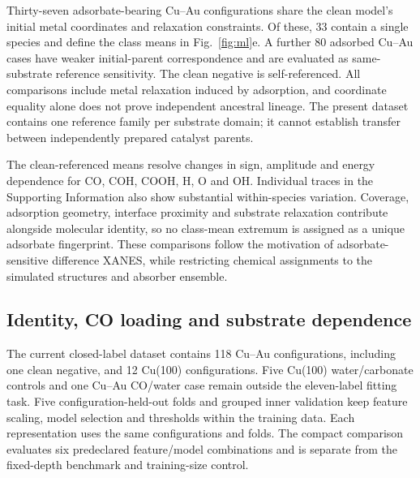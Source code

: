 \documentclass[11pt,a4paper]{article}
\begin{document}
Thirty-seven adsorbate-bearing Cu--Au configurations share the clean model's initial metal coordinates and relaxation constraints. Of these, 33 contain a single species and define the class means in Fig.~\ref{fig:ml}e. A further 80 adsorbed Cu--Au cases have weaker initial-parent correspondence and are evaluated as same-substrate reference sensitivity. The clean negative is self-referenced. All comparisons include metal relaxation induced by adsorption, and coordinate equality alone does not prove independent ancestral lineage. The present dataset contains one reference family per substrate domain; it cannot establish transfer between independently prepared catalyst parents.

The clean-referenced means resolve changes in sign, amplitude and energy dependence for CO, COH, COOH, H, O and OH. Individual traces in the Supporting Information also show substantial within-species variation. Coverage, adsorption geometry, interface proximity and substrate relaxation contribute alongside molecular identity, so no class-mean extremum is assigned as a unique adsorbate fingerprint. These comparisons follow the motivation of adsorbate-sensitive difference XANES,\cite{ramaker2010,ramaker2014} while restricting chemical assignments to the simulated structures and absorber ensemble.

\subsection{Identity, CO loading and substrate dependence}
The current closed-label dataset contains 118 Cu--Au configurations, including one clean negative, and 12 Cu(100) configurations. Five Cu(100) water/carbonate controls and one Cu--Au CO/water case remain outside the eleven-label fitting task. Five configuration-held-out folds and grouped inner validation keep feature scaling, model selection and thresholds within the training data. Each representation uses the same configurations and folds. The compact comparison evaluates six predeclared feature/model combinations and is separate from the fixed-depth benchmark and training-size control.
\end{document}
